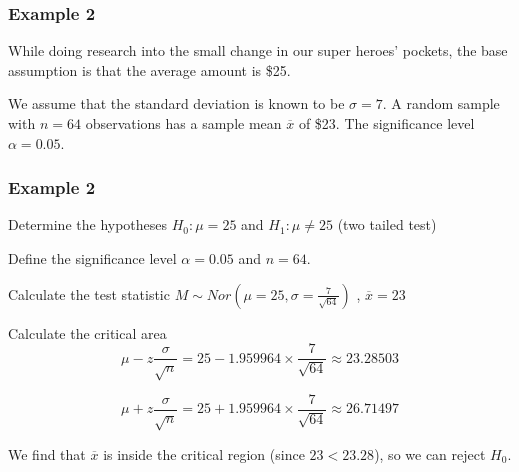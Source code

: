 \documentclass{beamer}
\begin{document}
\begin{frame}
    \centering
\end{frame}

\begin{frame}
  \frametitle{Example 2}
  While doing research into the small change in our super heroes' pockets, the base assumption is that the average amount is \$25.
  
  We assume that the standard deviation is known to be $\sigma = 7$. A random sample with $n=64$ observations has a sample mean $\overline{x}$ of \$23. The significance level $\alpha = 0.05$.
\end{frame}

\begin{frame}
  \frametitle{Example 2}
  \begin{block}{Determine the hypotheses}
  $H_{0} : \mu = 25$ and $H_{1}: \mu \neq 25$ (two tailed test)
  \end{block}

  \begin{block}{Define the significance level}
  $\alpha = 0.05$ and $n=64$.
  \end{block}

  \begin{block}{Calculate the test statistic}
    $M \sim Nor(\mu = 25, \sigma = \frac{7}{\sqrt{64}})$ , $\overline{x} = 23$
  \end{block}
\end{frame}

\begin{frame}
  \begin{block}{Calculate the critical area}
    \[ \mu - z \frac{\sigma}{\sqrt{n}} = 25 - 1.959964 \times \frac{7}{\sqrt{64}} \approx 23.28503 \]
    
    \[ \mu + z \frac{\sigma}{\sqrt{n}} = 25 + 1.959964 \times \frac{7}{\sqrt{64}} \approx 26.71497 \]
    
    We find that $\overline{x}$ is inside the critical region (since $23 < 23.28$), so we can reject $H_{0}$.
  \end{block}

\end{frame}
\end{document}

